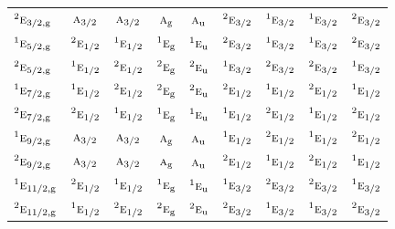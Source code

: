 \documentclass[10pt,a4paper]{article}
\numberwithin{equation}{section}
\newcommand{\irr}[1]{\text{\normalfont\scshape #1}}
\newcommand{\conjpair}[1]{{}^{#1}}
\newcommand{\ptag}[1]{\mathrm{#1}}
\begin{document}
{\begin{longtable}{@{}lcccccccc@{}}
$\conjpair{2}\irr{e}_{3/2,\ptag{g}}$ & $\irr{a}_{3/2}$ & $\irr{a}_{3/2}$ & $\irr{a}_{\ptag{g}}$ & $\irr{a}_{\ptag{u}}$ & $\conjpair{2}\irr{e}_{3/2}$ & $\conjpair{1}\irr{e}_{3/2}$ & $\conjpair{1}\irr{e}_{3/2}$ & $\conjpair{2}\irr{e}_{3/2}$\\
$\conjpair{1}\irr{e}_{5/2,\ptag{g}}$ & $\conjpair{2}\irr{e}_{1/2}$ & $\conjpair{1}\irr{e}_{1/2}$ & $\conjpair{1}\irr{e}_{\ptag{g}}$ & $\conjpair{1}\irr{e}_{\ptag{u}}$ & $\conjpair{2}\irr{e}_{3/2}$ & $\conjpair{1}\irr{e}_{3/2}$ & $\conjpair{1}\irr{e}_{3/2}$ & $\conjpair{2}\irr{e}_{3/2}$\\
$\conjpair{2}\irr{e}_{5/2,\ptag{g}}$ & $\conjpair{1}\irr{e}_{1/2}$ & $\conjpair{2}\irr{e}_{1/2}$ & $\conjpair{2}\irr{e}_{\ptag{g}}$ & $\conjpair{2}\irr{e}_{\ptag{u}}$ & $\conjpair{1}\irr{e}_{3/2}$ & $\conjpair{2}\irr{e}_{3/2}$ & $\conjpair{2}\irr{e}_{3/2}$ & $\conjpair{1}\irr{e}_{3/2}$\\
$\conjpair{1}\irr{e}_{7/2,\ptag{g}}$ & $\conjpair{1}\irr{e}_{1/2}$ & $\conjpair{2}\irr{e}_{1/2}$ & $\conjpair{2}\irr{e}_{\ptag{g}}$ & $\conjpair{2}\irr{e}_{\ptag{u}}$ & $\conjpair{2}\irr{e}_{1/2}$ & $\conjpair{1}\irr{e}_{1/2}$ & $\conjpair{2}\irr{e}_{1/2}$ & $\conjpair{1}\irr{e}_{1/2}$\\
$\conjpair{2}\irr{e}_{7/2,\ptag{g}}$ & $\conjpair{2}\irr{e}_{1/2}$ & $\conjpair{1}\irr{e}_{1/2}$ & $\conjpair{1}\irr{e}_{\ptag{g}}$ & $\conjpair{1}\irr{e}_{\ptag{u}}$ & $\conjpair{1}\irr{e}_{1/2}$ & $\conjpair{2}\irr{e}_{1/2}$ & $\conjpair{1}\irr{e}_{1/2}$ & $\conjpair{2}\irr{e}_{1/2}$\\
$\conjpair{1}\irr{e}_{9/2,\ptag{g}}$ & $\irr{a}_{3/2}$ & $\irr{a}_{3/2}$ & $\irr{a}_{\ptag{g}}$ & $\irr{a}_{\ptag{u}}$ & $\conjpair{1}\irr{e}_{1/2}$ & $\conjpair{2}\irr{e}_{1/2}$ & $\conjpair{1}\irr{e}_{1/2}$ & $\conjpair{2}\irr{e}_{1/2}$\\
$\conjpair{2}\irr{e}_{9/2,\ptag{g}}$ & $\irr{a}_{3/2}$ & $\irr{a}_{3/2}$ & $\irr{a}_{\ptag{g}}$ & $\irr{a}_{\ptag{u}}$ & $\conjpair{2}\irr{e}_{1/2}$ & $\conjpair{1}\irr{e}_{1/2}$ & $\conjpair{2}\irr{e}_{1/2}$ & $\conjpair{1}\irr{e}_{1/2}$\\
$\conjpair{1}\irr{e}_{11/2,\ptag{g}}$ & $\conjpair{2}\irr{e}_{1/2}$ & $\conjpair{1}\irr{e}_{1/2}$ & $\conjpair{1}\irr{e}_{\ptag{g}}$ & $\conjpair{1}\irr{e}_{\ptag{u}}$ & $\conjpair{1}\irr{e}_{3/2}$ & $\conjpair{2}\irr{e}_{3/2}$ & $\conjpair{2}\irr{e}_{3/2}$ & $\conjpair{1}\irr{e}_{3/2}$\\
$\conjpair{2}\irr{e}_{11/2,\ptag{g}}$ & $\conjpair{1}\irr{e}_{1/2}$ & $\conjpair{2}\irr{e}_{1/2}$ & $\conjpair{2}\irr{e}_{\ptag{g}}$ & $\conjpair{2}\irr{e}_{\ptag{u}}$ & $\conjpair{2}\irr{e}_{3/2}$ & $\conjpair{1}\irr{e}_{3/2}$ & $\conjpair{1}\irr{e}_{3/2}$ & $\conjpair{2}\irr{e}_{3/2}$\\

\end{longtable}}
\end{document}
